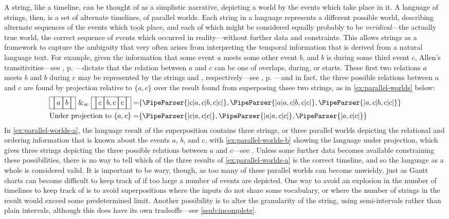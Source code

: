 \documentclass[a4paper,12pt,leqno,twoside]{article}
\newcommand{\vph}[1]{\vphantom{#1}}
\newcommand{\ebox}[1]{\fbox{$\vph{'(),}#1$}}
\newcommand{\nbMeets}[2]{\ebox{#1}\ebox{#2}}
\newcommand{\nbDuring}[2]{\ebox{#2}\ebox{#1,#2}\ebox{#2}}
\newcommand{\Meets}[2]{\ebox{}\nbMeets{#1}{#2}\ebox{}}
\newcommand{\During}[2]{\ebox{}\nbDuring{#1}{#2}\ebox{}}
\newcommand{\spvc}{~\&_{v\!c}~}
\newcommand{\EventString}[1]{%
	\renewcommand*{\do}[1]{\ebox{##1}}%
	\PipeParser{#1}%
}
\begin{document}
A string, like a timeline, can be thought of as a simplistic narrative, depicting a world by the events which take place in it. A language of strings, then, is a set of alternate timelines, of parallel worlds. Each string in a language represents a different possible world, describing alternate sequences of the events which took place, and each of which might be considered equally probably to be \textit{veridical}---the actually true world, the correct sequence of events which occurred in reality---without further data and constraints. This allows strings as a framework to capture the ambiguity that very often arises from interpreting the temporal information that is derived from a natural language text. For example, given the information that some event $a$ meets some other event $b$, and $b$ is during some third event $c$, Allen's transitivities---see , p. \pageref{tab:allen-trans-table}---dictate that the relation between $a$ and $c$ can be one of overlaps, during, or starts. These first two relations $a$ meets $b$ and $b$ during $c$ may be represented by the strings \Meets{a}{b} and \During{b}{c}, respectively---see , p. \pageref{tab:allen-rels-strings}---and in fact, the three possible relations between $a$ and $c$ are found by projection relative to $\{a,c\}$ over the result found from superposing thsee two strings, as in \cref{ex:parallel-worlds} below:
\begin{subequations}\label{ex:parallel-worlds}
	\begin{align}
		\Meets{a}{b} \spvc \During{b}{c} = &\{\EventString{{}|c|a,c|b,c|c|{}}, \EventString{{}|a|a,c|b,c|c|{}}, \EventString{{}|a,c|b,c|c|{}}\}\label{ex:parallel-worlds-a}\\
		\text{Under projection to }\{a,c\} = &\{\EventString{{}|c|a,c|c|{}}, \EventString{{}|a|a,c|c|{}}, \EventString{{}|a,c|c|{}}\}\label{ex:parallel-worlds-b}
	\end{align}
\end{subequations}
In \cref{ex:parallel-worlds-a}, the language result of the superposition contains three strings, or three parallel worlds depicting the relational and ordering information that is known about the events $a$, $b$, and $c$, with \cref{ex:parallel-worlds-b} showing the language under projection, which gives three strings depicting the three possible relations between $a$ and $c$---see . Unless some further data becomes available constraining these possibilities, there is no way to tell which of the three results of \cref{ex:parallel-worlds-a} is the correct timeline, and so the language as a whole is considered valid. It is important to be wary, though, as too many of these parallel worlds can become unwieldy, just as Gantt charts can become difficult to keep track of if too large a number of events are depicted. One way to avoid an explosion in the number of timelines to keep track of is to avoid superpositions where the inputs do not share some vocabulary, or where the number of strings in the result would exceed some predetermined limit. Another possibility is to alter the granularity of the string, using semi-intervals \citep{Freksa1992} rather than plain intervals, although this does have its own tradeoffs---see \cref{ssub:incomplete}.
\end{document}
